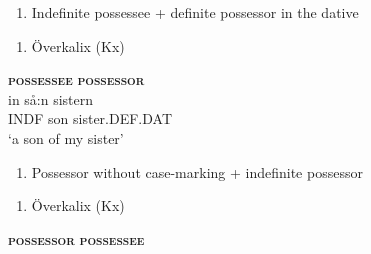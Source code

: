\begin{enumerate} %
\item 
Indefinite possessee + definite possessor in the dative

\end{enumerate} %
\begin{enumerate} %
\item 
Överkalix (Kx)

\end{enumerate} %
\ea\label{}
\gll \textbf{\textsc{possessee}} \textbf{\textsc{possessor}}\\


\ea\label{}
\gll in  så:n  sistern\\


INDF  son  sister.DEF.DAT\\ %


‘a son of my sister’
\z


\begin{enumerate} %
\item 
Possessor without case-marking + indefinite possessor

\end{enumerate} %
\begin{enumerate} %
\item 
Överkalix (Kx)

\end{enumerate} %
\ea\label{}
\gll \textbf{\textsc{possessor}} \textbf{\textsc{possessee}}\\


